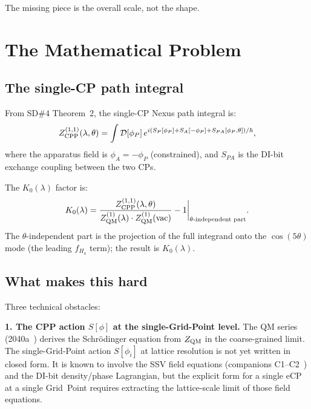 \documentclass[11pt,letterpaper]{article}
\begin{document}
The missing piece is the overall scale, not the shape.

\section{The Mathematical Problem}

\subsection{The single-CP path integral}

From SD\#4 Theorem~2, the single-CP Nexus path integral is:
\begin{equation}
Z_{\rm CPP}^{(1,1)}(\lambda,\theta)
= \int \mathcal{D}[\phi_P]\,
  e^{i(S_P[\phi_P] + S_A[-\phi_P] + S_{PA}[\phi_P,\theta])/\hbar},
\label{eq:Z_single}
\end{equation}
where the apparatus field is $\phi_A = -\phi_P$ (constrained),
and $S_{PA}$ is the DI-bit exchange coupling between the two CPs.

The $K_0(\lambda)$ factor is:
\begin{equation}
K_0(\lambda) = \frac{Z_{\rm CPP}^{(1,1)}(\lambda,\theta)}
                    {Z_{\rm QM}^{(1)}(\lambda) \cdot Z_{\rm QM}^{(1)}(\text{vac})}
               - 1 \bigg|_{\theta\text{-independent part}}.
\label{eq:K0_def}
\end{equation}
The $\theta$-independent part is the projection of the full
integrand onto the $\cos(5\theta)$ mode (the leading $f_{H_4}$ term);
the result is $K_0(\lambda)$.

\subsection{What makes this hard}

Three technical obstacles:

\textbf{1. The CPP action $S[\phi]$ at the single-Grid-Point level.}
The QM series (2040a~\citep{cpp2040a}) derives the Schrödinger
equation from $Z_{\rm QM}$ in the coarse-grained limit.  The
single-Grid-Point action $S[\phi_i]$ at lattice resolution is
not yet written in closed form.  It is known to involve the
SSV field equations (companions C1--C2~\citep{abshier_sr}) and
the DI-bit density/phase Lagrangian, but the explicit form for
a single eCP at a single Grid~Point requires extracting the
lattice-scale limit of those field equations.
\end{document}
